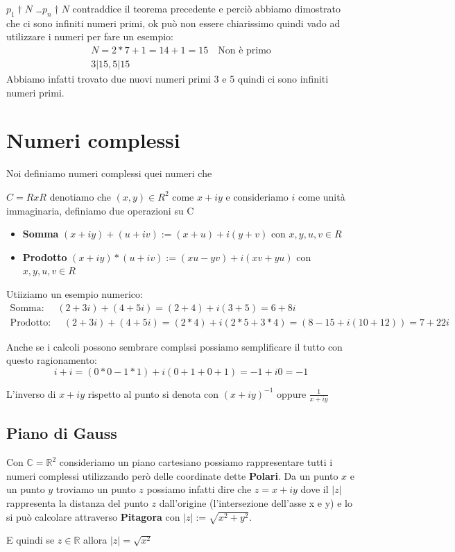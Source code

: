 \documentclass{article}
\begin{document}
$p_1 \dag N$ \ldots  $p_n \dag N$ contraddice il teorema precedente e perciò abbiamo dimostrato che ci sono infiniti numeri primi, ok può non essere chiarissimo quindi vado ad utilizzare i numeri per fare un esempio:
\begin{align*}
        N = 2 * 7 + 1 = 14 + 1 = 15 \quad \textrm{Non è primo} \\
        3 | 15, 5 | 15
\end{align*}
Abbiamo infatti trovato due nuovi numeri primi 3 e 5 quindi ci sono infiniti numeri primi.




\newpage
\section{Numeri complessi}\label{sec:numeri_complessi}
Noi definiamo numeri complessi quei numeri che


$C = R x R$ denotiamo che $(x,y) \in R^2$ come $x + iy$ e consideriamo $i$ come unità immaginaria, definiamo due operazioni su C
\begin{itemize}
        \item \textbf{Somma} $(x + iy) + (u + iv) := (x+u) + i(y+v)$ con $x,y,u,v \in R$
        \item \textbf{Prodotto} $(x + iy) * (u + iv) := (xu - yv) + i(xv+yu)$ con $x,y,u,v \in R$
\end{itemize}

Utiiziamo un esempio numerico:
\begin{align}
        \textrm{Somma: } \quad (2 + 3i) + (4 + 5i) = (2 + 4) + i(3 + 5) = 6 + 8i \\
        \textrm{Prodotto: } \quad (2 + 3i) + (4 + 5i) = (2 * 4) + i(2*5 + 3*4) = (8-15 + i(10+12)) = 7 + 22i
\end{align}

Anche se i calcoli possono sembrare complssi possiamo semplificare il tutto con questo ragionamento:
\begin{equation}
        i + i = (0*0 - 1*1) + i(0+1 + 0+1) = -1+ i0 = -1
\end{equation}

L'inverso di $x + iy$ rispetto al punto si denota con ${(x + iy)}^{-1}$ oppure $\frac{1}{x + iy}$


\subsection{Piano di Gauss}
Con $\mathbb{C} = \mathbb{R}^2$ consideriamo un piano cartesiano possiamo rappresentare tutti i numeri complessi utilizzando però delle coordinate dette \textbf{Polari}.
Da un punto $x$ e un punto $y$ troviamo un punto $z$ possiamo infatti dire che $z = x+iy$ dove il $|z|$  rappresenta la distanza del punto $z$ dall'origine (l'intersezione dell'asse x e y) e lo si può calcolare attraverso \textbf{Pitagora} con $|z| := \sqrt{x^2+y^2}$. \par
E quindi se $z \in \mathbb{R}$ allora $|z| = \sqrt{x^2}$
\end{document}
